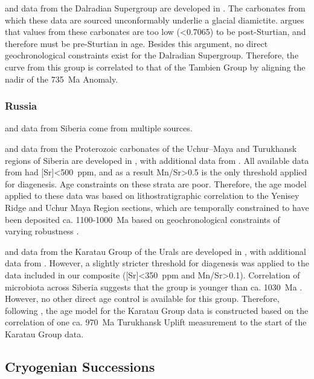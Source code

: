 \dC and \SrSr data from the Dalradian Supergroup are developed in \citet{Sawaki2010a}. The carbonates from which these data are sourced unconformably underlie a glacial diamictite. \citet{Brasier2000a} argues that \SrSr values from these carbonates are too low (\textless0.7065) to be post-Sturtian, and therefore must be pre-Sturtian in age. Besides this argument, no direct geochronological constraints exist for the Dalradian Supergroup. Therefore, the \dC curve from this group is correlated to that of the Tambien Group by aligning the nadir of the 735~Ma Anomaly.

\subsubsection{Russia}

\dC and \SrSr data from Siberia come from multiple sources.

\dC and \SrSr data from the Proterozoic carbonates of the Uchur–Maya and Turukhansk regions of Siberia are developed in \citet{Bartley2001a}, with additional \SrSr data from \citet{Cox2016a}. All available \SrSr data from \citet{Bartley2001a} had [Sr]\textless500~ppm, and as a result Mn/Sr\textgreater0.5 is the only threshold applied for diagenesis. Age constraints on these strata are poor. Therefore, the age model applied to these data was based on lithostratigraphic correlation to the Yenisey Ridge and Uchur Maya Region sections, which are temporally constrained to have been deposited ca. 1100-1000~Ma based on geochronological constraints of varying robustness \citep{Gallet2012a}.

\dC and \SrSr data from the Karatau Group of the Urals are developed in \citet{Kuznetsov2006a}, with additional \SrSr data from \citep{Cox2016a}. However, a slightly stricter threshold for \SrSr diagenesis was applied to the data included in our composite ([Sr]\textless350~ppm and Mn/Sr\textgreater0.1). Correlation of microbiota across Siberia suggests that the group is younger than ca. 1030~Ma \citep{Kuznetsov2006a}. However, no other direct age control is available for this group. Therefore, following \citet{Cox2016a}, the age model for the Karatau Group data is constructed based on the correlation of one ca. 970~Ma Turukhansk Uplift \SrSr measurement to the start of the Karatau Group data.

\subsection{Cryogenian Successions}

